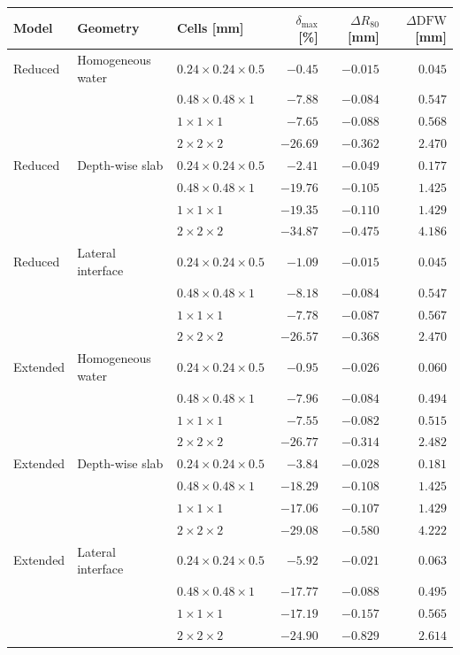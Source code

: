 \begin{tabular}{lll rrr}
\toprule
Model & Geometry & Cells [mm] & $\delta_{\max}$ [\%] & $\Delta R_{80}$ [mm] & $\Delta\mathrm{DFW}$ [mm] \\
\midrule
Reduced & Homogeneous water & $0.24\times0.24\times0.5$ & $-0.45$ & $-0.015$ & $0.045$ \\
 &  & $0.48\times0.48\times1$ & $-7.88$ & $-0.084$ & $0.547$ \\
 &  & $1\times1\times1$ & $-7.65$ & $-0.088$ & $0.568$ \\
 &  & $2\times2\times2$ & $-26.69$ & $-0.362$ & $2.470$ \\
\addlinespace
Reduced & Depth-wise slab & $0.24\times0.24\times0.5$ & $-2.41$ & $-0.049$ & $0.177$ \\
 &  & $0.48\times0.48\times1$ & $-19.76$ & $-0.105$ & $1.425$ \\
 &  & $1\times1\times1$ & $-19.35$ & $-0.110$ & $1.429$ \\
 &  & $2\times2\times2$ & $-34.87$ & $-0.475$ & $4.186$ \\
\addlinespace
Reduced & Lateral interface & $0.24\times0.24\times0.5$ & $-1.09$ & $-0.015$ & $0.045$ \\
 &  & $0.48\times0.48\times1$ & $-8.18$ & $-0.084$ & $0.547$ \\
 &  & $1\times1\times1$ & $-7.78$ & $-0.087$ & $0.567$ \\
 &  & $2\times2\times2$ & $-26.57$ & $-0.368$ & $2.470$ \\
\addlinespace
Extended & Homogeneous water & $0.24\times0.24\times0.5$ & $-0.95$ & $-0.026$ & $0.060$ \\
 &  & $0.48\times0.48\times1$ & $-7.96$ & $-0.084$ & $0.494$ \\
 &  & $1\times1\times1$ & $-7.55$ & $-0.082$ & $0.515$ \\
 &  & $2\times2\times2$ & $-26.77$ & $-0.314$ & $2.482$ \\
\addlinespace
Extended & Depth-wise slab & $0.24\times0.24\times0.5$ & $-3.84$ & $-0.028$ & $0.181$ \\
 &  & $0.48\times0.48\times1$ & $-18.29$ & $-0.108$ & $1.425$ \\
 &  & $1\times1\times1$ & $-17.06$ & $-0.107$ & $1.429$ \\
 &  & $2\times2\times2$ & $-29.08$ & $-0.580$ & $4.222$ \\
\addlinespace
Extended & Lateral interface & $0.24\times0.24\times0.5$ & $-5.92$ & $-0.021$ & $0.063$ \\
 &  & $0.48\times0.48\times1$ & $-17.77$ & $-0.088$ & $0.495$ \\
 &  & $1\times1\times1$ & $-17.19$ & $-0.157$ & $0.565$ \\
 &  & $2\times2\times2$ & $-24.90$ & $-0.829$ & $2.614$ \\
\bottomrule
\end{tabular}
